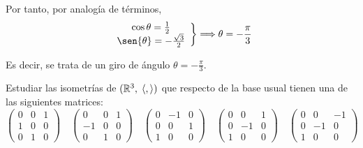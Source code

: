 \begin{ejercicio}
\begin{enumerate}
        Por tanto, por analogía de términos,
        \begin{equation*}
            \left.\begin{array}{c}
                \cos{\theta} = \frac{1}{2} \\
                \sen{\theta} = -\frac{\sqrt{3}}{2}
            \end{array}\right\} \Longrightarrow \theta = -\frac{\pi}{3}
        \end{equation*}
        
        Es decir, se trata de un giro de ángulo $\theta=-\frac{\pi}{3}$.
        
    \end{enumerate}
\end{ejercicio}


\begin{ejercicio}
    Estudiar las isometrías de $(\mathbb{R}^3,\;\langle,\rangle)$ que respecto de la base usual tienen una de las siguientes matrices:
    \begin{equation*}
        \left(\begin{array}{ccc}
            0 & 0 & 1 \\
            1 & 0 & 0 \\
            0 & 1 & 0
        \end{array}\right)
        \quad
        \left(\begin{array}{ccc}
            0 & 0 & 1 \\
            -1 & 0 & 0 \\
            0 & 1 & 0
        \end{array}\right)
        \quad
        \left(\begin{array}{ccc}
            0 & -1 & 0 \\
            0 & 0 & 1 \\
            1 & 0 & 0
        \end{array}\right)
        \quad
        \left(\begin{array}{ccc}
            0 & 0 & 1 \\
            0 & -1 & 0 \\
            1 & 0 & 0
        \end{array}\right)
        \quad
        \left(\begin{array}{ccc}
            0 & 0 & -1 \\
            0 & -1 & 0 \\
            1 & 0 & 0
        \end{array}\right)
    \end{equation*}


\end{ejercicio}
